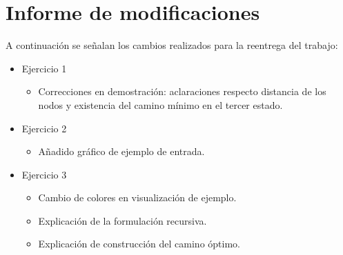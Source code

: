\section*{Informe de modificaciones}

A continuación se señalan los cambios realizados para la reentrega del trabajo:

\begin{itemize}
	\item{
		Ejercicio 1
		\begin{itemize}
			\item{Correcciones en demostración: aclaraciones respecto distancia
				de los nodos y existencia del camino mínimo en el tercer estado.}
		\end{itemize}
	}
	\item{
		Ejercicio 2
		\begin{itemize}
			\item{Añadido gráfico de ejemplo de entrada.}
		\end{itemize}
	}
	\item{
		Ejercicio 3
		\begin{itemize}
			\item{Cambio de colores en visualización de ejemplo.}
			\item{Explicación de la formulación recursiva.}
			\item{Explicación de construcción del camino óptimo.}
		\end{itemize}
	}
\end{itemize}
